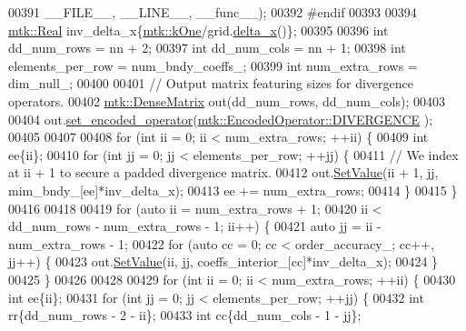 \begin{DoxyCode}
{{00391                       \_\_FILE\_\_, \_\_LINE\_\_, \_\_func\_\_);
00392 \textcolor{preprocessor}{  #endif}
00393 
00394   \hyperlink{group__c01-roots_gac080bbbf5cbb5502c9f00405f894857d}{mtk::Real} inv\_delta\_x\{\hyperlink{group__c01-roots_ga26407c24d43b6b95480943340d285c71}{mtk::kOne}/grid.\hyperlink{classmtk_1_1UniStgGrid1D_a6e7173b01241632cf509496d66b9f74c}{delta\_x}()\};
00395 
00396   \textcolor{keywordtype}{int} dd\_num\_rows = nn + 2;
00397   \textcolor{keywordtype}{int} dd\_num\_cols = nn + 1;
00398   \textcolor{keywordtype}{int} elements\_per\_row = num\_bndy\_coeffs\_;
00399   \textcolor{keywordtype}{int} num\_extra\_rows = dim\_null\_;
00400 
00401   \textcolor{comment}{// Output matrix featuring sizes for divergence operators.}
00402   \hyperlink{classmtk_1_1DenseMatrix}{mtk::DenseMatrix} out(dd\_num\_rows, dd\_num\_cols);
00403 
00404   out.\hyperlink{classmtk_1_1DenseMatrix_ac0f824b0fec88c4fb42e77b7550fb0d3}{set\_encoded\_operator}(\hyperlink{namespacemtk_ga9b50023bfb2692219d2915feade94f80a4e4e9e6d004c642e33d6f823b57bd60e}{mtk::EncodedOperator::DIVERGENCE}
      );
00405 
00407 
00408   \textcolor{keywordflow}{for} (\textcolor{keywordtype}{int} ii = 0; ii < num\_extra\_rows; ++ii) \{
00409     \textcolor{keywordtype}{int} ee\{ii\};
00410     \textcolor{keywordflow}{for} (\textcolor{keywordtype}{int} jj = 0; jj < elements\_per\_row; ++jj) \{
00411       \textcolor{comment}{// We index at ii + 1 to secure a padded divergence matrix.}
00412       out.\hyperlink{classmtk_1_1DenseMatrix_a784ce5784109ac86bfb9d8562b334b13}{SetValue}(ii + 1, jj, mim\_bndy\_[ee]*inv\_delta\_x);
00413       ee += num\_extra\_rows;
00414     \}
00415   \}
00416 
00418 
00419   \textcolor{keywordflow}{for} (\textcolor{keyword}{auto} ii = num\_extra\_rows + 1;
00420        ii < dd\_num\_rows - num\_extra\_rows - 1; ii++) \{
00421     \textcolor{keyword}{auto} jj = ii - num\_extra\_rows - 1;
00422     \textcolor{keywordflow}{for} (\textcolor{keyword}{auto} cc = 0; cc < order\_accuracy\_; cc++, jj++) \{
00423       out.\hyperlink{classmtk_1_1DenseMatrix_a784ce5784109ac86bfb9d8562b334b13}{SetValue}(ii, jj, coeffs\_interior\_[cc]*inv\_delta\_x);
00424     \}
00425   \}
00426 
00428 
00429   \textcolor{keywordflow}{for} (\textcolor{keywordtype}{int} ii = 0; ii < num\_extra\_rows; ++ii) \{
00430     \textcolor{keywordtype}{int} ee\{ii\};
00431     \textcolor{keywordflow}{for} (\textcolor{keywordtype}{int} jj = 0; jj < elements\_per\_row; ++jj) \{
00432       \textcolor{keywordtype}{int} rr\{dd\_num\_rows - 2 - ii\};
00433       \textcolor{keywordtype}{int} cc\{dd\_num\_cols - 1 - jj\};
}}
\end{DoxyCode}
